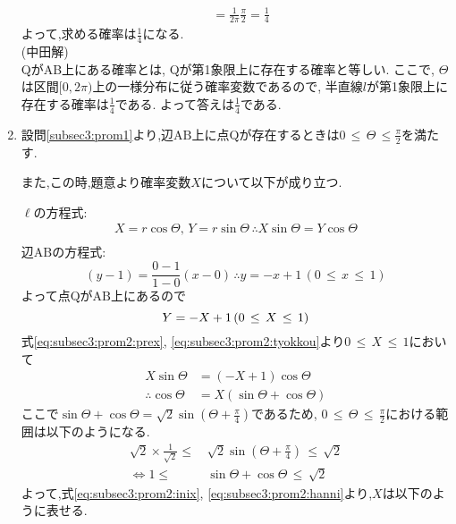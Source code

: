 \begin{enumerate}[(1)]
\begin{align*}
      &= \frac{1}{2\pi}\frac{\pi}{2} = \frac{1}{4}
  \end{align*}
  よって,求める確率は$\frac{1}{4}$になる.\\[1cm]
  (中田解)\\
  QがAB上にある確率とは, Qが第1象限上に存在する確率と等しい. ここで, $\Theta$は区間$[0,2\pi)$上の一様分布に従う確率変数であるので, 半直線$l$が第1象限上に存在する確率は$\displaystyle \frac{1}{4}$である. よって答えは$\displaystyle \frac{1}{4}$である.
\item 設問\eqref{subsec3:prom1}より,辺$\mathrm{AB}$上に点$\mathrm{Q}$が存在するときは$0\, \leq \, \Theta\, \leq \frac{\pi}{2}$を満たす.
  
  また,この時,題意より確率変数$X$について以下が成り立つ.
  
  $\ell$の方程式: 
  \begin{align}
    X = r\cos\Theta, \, Y = r\sin\Theta\, 
    \therefore X\sin\Theta = Y\cos\Theta\label{eq:subsec3:prom2:prex}\\
  \end{align}
  辺$\mathrm{AB}$の方程式:
  \begin{equation*}
    (y - 1) = \frac{0 - 1}{1 - 0}(x - 0)\, \therefore y = -x + 1\, (0\, \leq \, x \, \leq \, 1)
  \end{equation*}
  よって点$\mathrm{Q}$が$\mathrm{AB}$上にあるので
  \begin{equation}
    Y = -X + 1\, (0\, \leq\,  X\, \leq \, 1)\label{eq:subsec3:prom2:tyokkou}\\
  \end{equation}
  式\eqref{eq:subsec3:prom2:prex}, \eqref{eq:subsec3:prom2:tyokkou}より$0\, \leq\, X\, \leq\, 1$において
  \begin{align}
    X\sin\Theta &= (-X + 1)\cos\Theta\nonumber\\
    \therefore \cos\Theta &= X(\sin\Theta + \cos\Theta)\label{eq:subsec3:prom2:inix}
  \end{align}
  ここで$\sin\Theta + \cos\Theta = \sqrt{2}\sin\left(\Theta + \frac{\pi}{4}\right)$であるため,
  $0\, \leq\, \Theta\, \leq \, \frac{\pi}{2}$における範囲は以下のようになる.
  \begin{align}
    \sqrt{2}\times\frac{1}{\sqrt{2}} \leq\, &\sqrt{2}\sin\left(\Theta + \frac{\pi}{4}\right) \, \leq\, \sqrt{2}\nonumber\\
    \Longleftrightarrow 
    1 \leq\, &\sin\Theta + \cos\Theta \, \leq\, \sqrt{2}\label{eq:subsec3:prom2:hanni}
  \end{align}
  よって,式\eqref{eq:subsec3:prom2:inix}, \eqref{eq:subsec3:prom2:hanni}より,$X$は以下のように表せる.

\end{enumerate}
